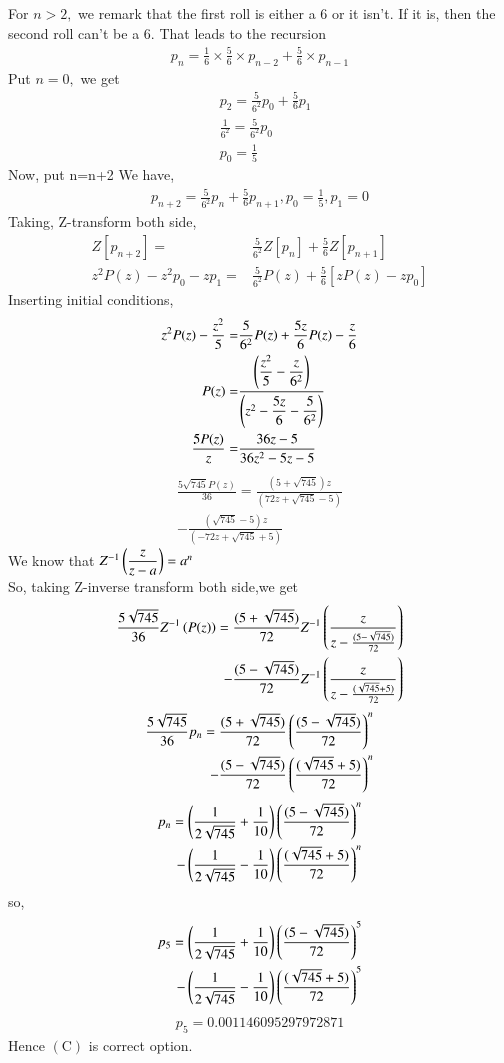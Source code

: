 \documentclass[journal,12pt,twocolumn]{IEEEtran}
\begin{document}
For $n>2,$ we remark that the first roll is either a 6 or it isn't. If it is, then the second roll can't be a 6. That leads to the recursion
\begin{align}
p_n=\frac{1}{6} \times \frac{5}{6} \times p_{n-2}+\frac{5}{6} \times p_{n-1}
\end{align}
Put $n=0,$ we get
\begin{align}
&p_2=\frac{5}{6^{2}}p_0+\frac{5}{6}p_1\\
&\frac{1}{6^{2}}=\frac{5}{6^{2}}p_0\\
&p_0=\frac{1}{5}
\end{align}
Now, put n=n+2 
We have,
\begin{align}
p_{n+2}=\frac{5}{6^{2}}p_{n}+\frac{5}{6}p_{n+1},p_0=\frac{1}{5},p_1=0
\end{align}
Taking, Z-transform both side,
\begin{align}
Z[p_{n+2}]=&\frac{5}{6^{2}}Z[p_{n}]+\frac{5}{6}Z[p_{n+1}]\\
z^2P(z)-z^2p_0-zp_1=&\frac{5}{6^2}P(z)+\frac{5}{6}[zP(z)-zp_0]
\end{align}
Inserting initial conditions,
\begin{align}
z^2P(z)-\frac{z^2}{5}=&\frac{5}{6^2}P(z)+\frac{5z}{6}P(z)-\frac{z}{6} \\
P(z)=&\dfrac{\left(\dfrac{z^2}{5}-\dfrac{z}{6^2}\right)}{\left(z^2-\dfrac{5z}{6}-\dfrac{5}{6^2}\right)}\\
\frac{5P(z)}{z}=&\frac{36z-5}{36z^2-5z-5}
\end{align}
\begin{align}
\frac{5\sqrt{745}P(z)}{36}=\frac{(5+\sqrt{745})z}{(72 z+\sqrt{745}-5)}\\
-\frac{(\sqrt{745}-5)z}{(-72 z+\sqrt{745}+5)}
\end{align}
We know that $Z^{-1}\left(\dfrac{z}{z-a}\right)=a^n$\\
So, taking Z-inverse transform both side,we get
\begin{align}
\frac{5\sqrt{745}}{36}Z^{-1}\left(P(z)\right)=\dfrac{(5+\sqrt{745})}{72}Z^{-1}\left(\frac{z}{z-\frac{(5-\sqrt{745})}{72}}\right)\\
-\frac{(5-\sqrt{745})}{72}Z^{-1}\left(\frac{z}{z-\frac{(\sqrt{745}+5)}{72}}\right)
\end{align}
\begin{align}
\frac{5\sqrt{745}}{36}p_n=\frac{(5+\sqrt{745})}{72}\left(\frac{(5-\sqrt{745})}{72}\right)^{n}\\
-\frac{(5-\sqrt{745})}{72}\left(\frac{(\sqrt{745}+5)}{72}\right)^{n}
\end{align}
\begin{align}
p_n=\left(\frac{1}{2\sqrt{745}}+\frac{1}{10}\right)\left(\frac{(5-\sqrt{745})}{72}\right)^{n}\\
-\left(\frac{1}{2\sqrt{745}}-\frac{1}{10}\right)\left(\frac{(\sqrt{745}+5)}{72}\right)^{n}
\end{align}
so,
\begin{align}
p_5=\left(\frac{1}{2\sqrt{745}}+\frac{1}{10}\right)\left(\frac{(5-\sqrt{745})}{72}\right)^{5}\\
-\left(\frac{1}{2\sqrt{745}}-\frac{1}{10}\right)\left(\frac{(\sqrt{745}+5)}{72}\right)^{5}
\end{align}
\begin{align}
p_5=0.001146095297972871
\end{align}
Hence $(\mathrm{C})$ is correct option.
\end{document}
